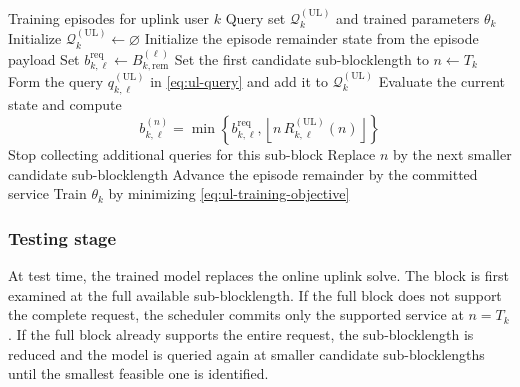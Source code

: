 \documentclass[11pt]{article}
\newcommand{\Qset}{\mathcal{Q}}
\newcommand{\floor}[1]{\left\lfloor #1 \right\rfloor}
\newcommand{\UL}{\mathrm{UL}}
\begin{document}
\begin{algorithm}[H]
\caption{Uplink Training Stage}
\label{alg:ul-train-stage}
\small
\begin{algorithmic}[1]
\Require Training episodes for uplink user $k$
\Ensure Query set $\Qset_k^{(\UL)}$ and trained parameters $\theta_k$
\State Initialize $\Qset_k^{(\UL)}\gets\varnothing$
    \State Initialize the episode remainder state from the episode payload
        \State Set $b_{k,\ell}^{\mathrm{req}} \gets B_{k,\mathrm{rem}}^{(\ell)}$
        \State Set the first candidate sub-blocklength to $n\gets T_k$
            \State Form the query $q_{k,\ell}^{(\UL)}$ in \eqref{eq:ul-query} and add it to $\Qset_k^{(\UL)}$
            \State Evaluate the current state and compute
            \[
            b_{k,\ell}^{(n)}
            =
            \min\!\left\{
            b_{k,\ell}^{\mathrm{req}},
            \floor{n\,R_{k,\ell}^{(\UL)}(n)}
            \right\}
            \]
                \State Stop collecting additional queries for this sub-block
            \Else
                \State Replace $n$ by the next smaller candidate sub-blocklength
            \EndIf
        \EndWhile
        \State Advance the episode remainder by the committed service
    \EndFor
\EndFor
\State Train $\theta_k$ by minimizing \eqref{eq:ul-training-objective}
\end{algorithmic}
\end{algorithm}

\subsubsection{Testing stage}

At test time, the trained model replaces the online uplink solve. The block is
first examined at the full available sub-blocklength. If the full block does not
support the complete request, the scheduler commits only the supported service
at $n=T_k$. If the full block already supports the entire request, the
sub-blocklength is reduced and the model is queried again at smaller candidate
sub-blocklengths until the smallest feasible one is identified.
\end{document}
